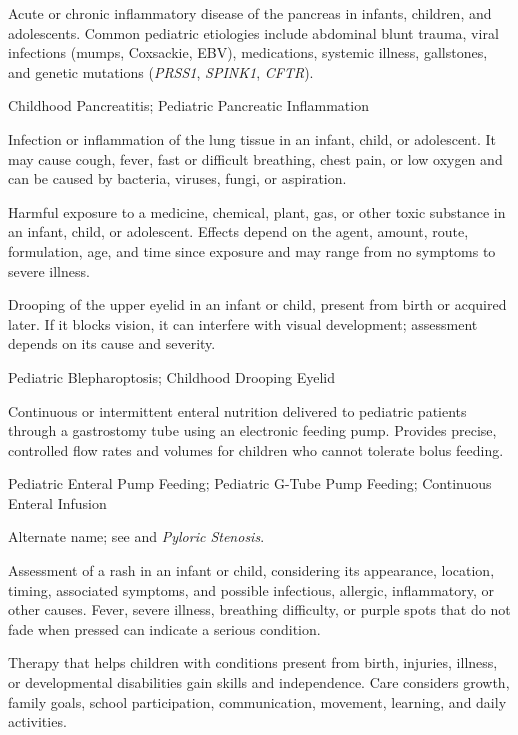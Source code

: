  Acute or chronic inflammatory disease of the pancreas in infants, children, and adolescents. Common pediatric etiologies include abdominal blunt trauma, viral infections (mumps, Coxsackie, EBV), medications, systemic illness, gallstones, and genetic mutations (\textit{PRSS1}, \textit{SPINK1}, \textit{CFTR}).

\synonyms
Childhood Pancreatitis; Pediatric Pancreatic Inflammation

 Infection or inflammation of the lung tissue in an infant, child, or adolescent. It may cause cough, fever, fast or difficult breathing, chest pain, or low oxygen and can be caused by bacteria, viruses, fungi, or aspiration.

 Harmful exposure to a medicine, chemical, plant, gas, or other toxic substance in an infant, child, or adolescent. Effects depend on the agent, amount, route, formulation, age, and time since exposure and may range from no symptoms to severe illness.

 Drooping of the upper eyelid in an infant or child, present from birth or acquired later. If it blocks vision, it can interfere with visual development; assessment depends on its cause and severity.

\synonyms
Pediatric Blepharoptosis; Childhood Drooping Eyelid

 Continuous or intermittent enteral nutrition delivered to pediatric patients through a gastrostomy tube using an electronic feeding pump. Provides precise, controlled flow rates and volumes for children who cannot tolerate bolus feeding.

\synonyms
Pediatric Enteral Pump Feeding; Pediatric G-Tube Pump Feeding; Continuous Enteral Infusion

 Alternate name; see  and \textit{Pyloric Stenosis}.

 Assessment of a rash in an infant or child, considering its appearance, location, timing, associated symptoms, and possible infectious, allergic, inflammatory, or other causes. Fever, severe illness, breathing difficulty, or purple spots that do not fade when pressed can indicate a serious condition.

 Therapy that helps children with conditions present from birth, injuries, illness, or developmental disabilities gain skills and independence. Care considers growth, family goals, school participation, communication, movement, learning, and daily activities.

